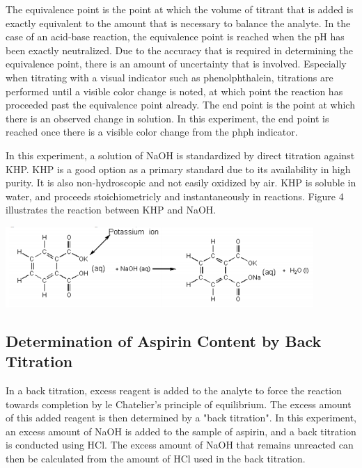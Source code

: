 \documentclass{article}
\begin{document}
The equivalence point is the point at which the volume of titrant that is added is exactly
equivalent to the amount that is necessary to balance the analyte. In the case of an acid-base
reaction, the equivalence point is reached when the pH has been exactly neutralized.
Due to the accuracy that is required in determining the equivalence point, there is an amount of
uncertainty that is involved. Especially when titrating with a visual indicator such as
phenolphthalein, titrations are performed until a visible color change is noted, at which point the
reaction has proceeded past the equivalence point already. 
The end point is the point at which there is an observed change in solution. In this experiment, the
end point is reached once there is a visible color change from the phph indicator. \cite{aspirin_rxn}

In this experiment, a solution of NaOH is standardized by direct titration against KHP.
KHP is a good option as a primary standard due to its availability in high purity. It is also
non-hydroscopic and not easily oxidized by air. KHP is soluble in water, and proceeds
stoichiometricly and instantaneously in reactions.
Figure 4 illustrates the reaction between KHP and NaOH.
\begin{center}
        \includegraphics[scale=1]{KHP_rxn}
\end{center}

\subsection{Determination of Aspirin Content by Back Titration}

In a  back titration, excess reagent is added to the analyte to force the reaction towards
completion by le Chatelier's principle of equilibrium. The excess amount of this added reagent is
then determined by a "back titration". In this experiment, an excess amount of NaOH is added to the
sample of aspirin, and a back titration is conducted using HCl. The excess amount of NaOH that
remains unreacted can then be calculated from the amount of HCl used in the back titration.
\cite{lab_man}
\end{document}
